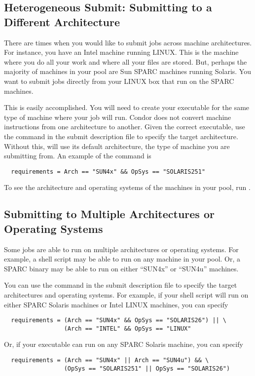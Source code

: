 \subsection{Heterogeneous Submit: Submitting to a Different Architecture} 

There are times when you would like to submit jobs across machine
architectures. For instance, you have an Intel machine running
LINUX. This is the machine where you do all your
work and where all your files are stored. But, perhaps the majority of
machines in your pool are Sun SPARC machines running Solaris. You
want to submit jobs directly from your LINUX box that run on the
SPARC machines.

This is easily accomplished.  You will need to create your
executable for the same type of machine where your job will run.
Condor does not convert machine instructions from one architecture
to another. 
Given the correct executable, use the
 command in
the submit description file to
specify the target architecture.
Without this, 
will use its default architecture, 
the type of machine you are submitting from.
An example of the command is
\begin{verbatim}
  requirements = Arch == "SUN4x" && OpSys == "SOLARIS251"
\end{verbatim}
To see the architecture and operating systems of the machines
in your pool,
run .

\subsection{Submitting to Multiple Architectures or Operating Systems} 


Some jobs are able to run on multiple architectures or operating
systems.  For example, a shell script may be able to run on any
machine in your pool.  Or, a SPARC binary may be able to run on either
``SUN4x'' or ``SUN4u'' machines.

You can use the 
 command in
the submit description file to
specify the target architectures and operating systems.
For example, if your shell script will run on either SPARC Solaris
machines or Intel LINUX machines, you can specify
\begin{verbatim}
  requirements = (Arch == "SUN4x" && OpSys == "SOLARIS26") || \
                 (Arch == "INTEL" && OpSys == "LINUX"
\end{verbatim}
Or, if your executable can run on any SPARC Solaris machine, you can
specify
\begin{verbatim}
  requirements = (Arch == "SUN4x" || Arch == "SUN4u") && \
                 (OpSys == "SOLARIS251" || OpSys == "SOLARIS26")
\end{verbatim}

